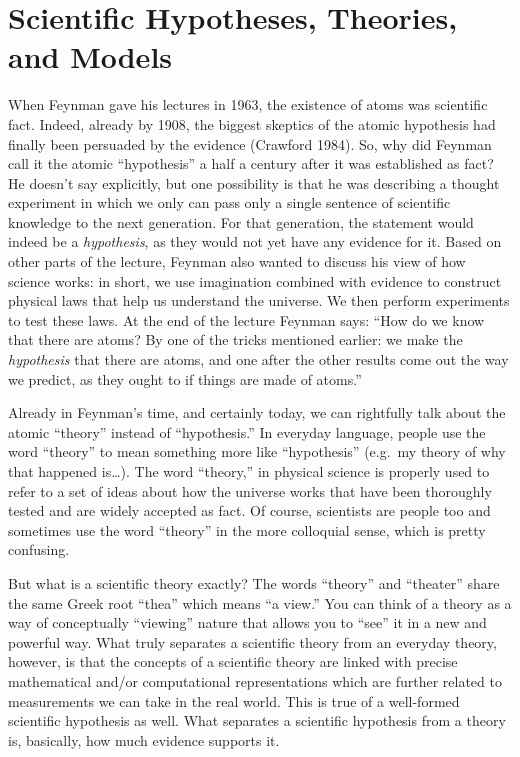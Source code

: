 \documentclass{book}
\begin{document}
\hypertarget{scientific-hypotheses-theories-and-models}{%
\section{Scientific Hypotheses, Theories, and
Models}\label{scientific-hypotheses-theories-and-models}}

When Feynman gave his lectures in 1963, the existence of atoms was scientific
fact. Indeed, already by 1908, the biggest skeptics of the atomic hypothesis
had finally been persuaded by the evidence (Crawford 1984). So, why did
Feynman call it the atomic ``hypothesis'' a half a century after it was
established as fact? He doesn't say explicitly, but one possibility is that he
was describing a thought experiment in which we only can pass only a single
sentence of scientific knowledge to the next generation. For that generation,
the statement would indeed be a \emph{hypothesis}, as they would not yet have
any evidence for it. Based on other parts of the lecture, Feynman also wanted
to discuss his view of how science works: in short, we use imagination
combined with evidence to construct physical laws that help us understand the
universe. We then perform experiments to test these laws. At the end of the
lecture Feynman says: ``How do we know that there are atoms? By one of the
tricks mentioned earlier: we make the \emph{hypothesis} that there are atoms,
and one after the other results come out the way we predict, as they ought to
if things are made of atoms.''

Already in Feynman's time, and certainly today, we can rightfully talk about
the atomic ``theory'' instead of ``hypothesis.'' In everyday language, people
use the word ``theory'' to mean something more like ``hypothesis'' (e.g.~my
theory of why that happened is\ldots). The word ``theory,'' in physical
science is properly used to refer to a set of ideas about how the universe
works that have been thoroughly tested and are widely accepted as fact. Of
course, scientists are people too and sometimes use the word ``theory'' in the
more colloquial sense, which is pretty confusing.

But what is a scientific theory exactly? The words ``theory'' and ``theater''
share the same Greek root ``thea'' which means ``a view.'' You can think of a
theory as a way of conceptually ``viewing'' nature that allows you to ``see''
it in a new and powerful way. What truly separates a scientific theory from an
everyday theory, however, is that the concepts of a scientific theory are
linked with precise mathematical and/or computational representations which
are further related to measurements we can take in the real world. This is
true of a well-formed scientific hypothesis as well. What separates a
scientific hypothesis from a theory is, basically, how much evidence supports
it.
\end{document}
